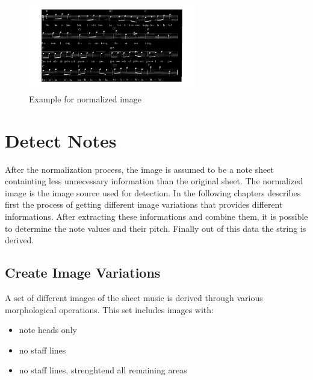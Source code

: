 \begin{figure}[Htbp]
    \centering
		\includegraphics[width=0.65\textwidth]{normalized.jpg}
		\caption{Example for normalized image \label{fig:normalized}}
\end{figure}


\section{Detect Notes}
After the normalization process, the image is assumed to be a note sheet containting less unnecessary information than the original sheet. The normalized image is the image source used for detection. In the following chapters describes first the process of getting different image variations that provides different informations. After extracting these informations and combine them, it is possible to determine the note values and their pitch. Finally out of this data the string is derived.  
\subsection{Create Image Variations}
A set of different images of the sheet music is derived through various morphological operations. This set includes images with:

\begin{itemize}
\item note heads only
\item no staff lines 
\item no staff lines, strenghtend all remaining areas
\end{itemize}

